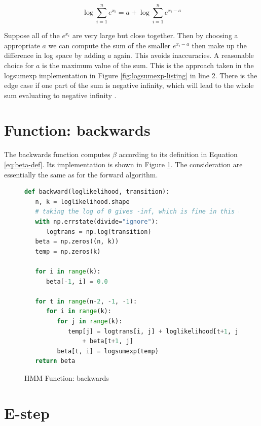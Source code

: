 \begin{equation}
\log \sum_{i=1}^{n} e^{x_{i}}=a+\log \sum_{i=1}^{n} e^{x_{i}-a}
\end{equation}

Suppose all of the $e^{x_i}$ are very large but close together. Then by choosing a appropriate $a$ we can compute the sum of the smaller $e^{x_i-a}$ then make up the difference in log space by adding $a$ again. This avoids inaccuracies. A reasonable choice for $a$ is the maximum value of the sum. This is the approach taken in the logsumexp implementation in Figure \ref{fig:logsumexp-listing} in line 2. There is the edge case if one part of the sum is negative infinity, which will lead to the whole sum evaluating to negative infinity \parencite{mllecture}.


\section{Function: backwards}

The backwards function computes $\beta$ according to its definition in Equation \ref{eq:beta-def}. Its implementation is shown in Figure \ref{fig:hmm-backwards-listing}. The consideration are essentially the same as for the forward algorithm. 

\begin{figure}
\begin{singlespace}
\begin{lstlisting}[language=Python]
def backward(loglikelihood, transition):
   n, k = loglikelihood.shape
   # taking the log of 0 gives -inf, which is fine in this case
   with np.errstate(divide="ignore"):
      logtrans = np.log(transition)
   beta = np.zeros((n, k))
   temp = np.zeros(k)

   for i in range(k):
      beta[-1, i] = 0.0

   for t in range(n-2, -1, -1):
      for i in range(k):
         for j in range(k):
            temp[j] = logtrans[i, j] + loglikelihood[t+1, j] \
                + beta[t+1, j]
         beta[t, i] = logsumexp(temp)
   return beta
\end{lstlisting}
\end{singlespace}
\caption{HMM Function: backwards}    
\label{fig:hmm-backwards-listing}
\end{figure}

\section{E-step}

